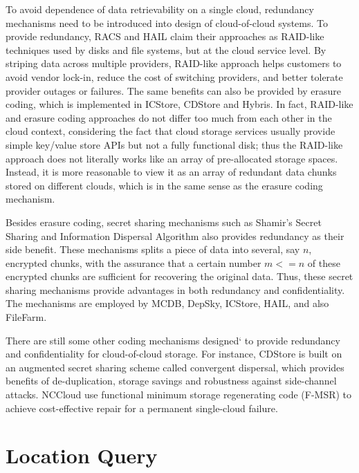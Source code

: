 To avoid dependence of data retrievability on a single cloud, redundancy mechanisms need to be introduced into design of cloud-of-cloud systems. To provide redundancy, RACS\cite{abu2010racs} and HAIL\cite{bowers2009hail} claim their approaches as RAID-like techniques used by disks and file systems, but at the cloud service level. By striping data across multiple providers, RAID-like approach helps customers to avoid vendor lock-in, reduce the cost of switching providers, and better tolerate provider outages or failures. The same benefits can also be provided by erasure coding, which is implemented in ICStore\cite{cachin2010dependable}, CDStore\cite{li2015cdstore} and Hybris\cite{dobre2014hybris}. In fact, RAID-like and erasure coding approaches do not differ too much from each other in the cloud context, considering the fact that cloud storage services usually provide simple key/value store APIs but not a fully functional disk; thus the RAID-like approach does not literally works like an array of pre-allocated storage spaces. Instead, it is more reasonable to view it as an array of redundant data chunks stored on different clouds, which is in the same sense as the erasure coding mechanism.

Besides erasure coding, secret sharing mechanisms such as Shamir's Secret Sharing\cite{shamir1979share} and Information Dispersal Algorithm\cite{rabin1989efficient} also provides redundancy as their side benefit. These mechanisms splits a piece of data into several, say $n$, encrypted chunks, with the assurance that a certain number $m <= n$ of these encrypted chunks are sufficient for recovering the original data. Thus, these secret sharing mechanisms provide advantages in both redundancy and confidentiality. The mechanisms are employed by MCDB\cite{alzain2011mcdb}, DepSky\cite{bessani2013depsky}, ICStore\cite{cachin2010dependable}, HAIL\cite{bowers2009hail}, and also FileFarm.

There are still some other coding mechanisms designed` to provide redundancy and confidentiality for cloud-of-cloud storage. For instance, CDStore\cite{li2015cdstore} is built on an augmented secret sharing scheme called convergent dispersal, which provides benefits of de-duplication, storage savings and robustness against side-channel attacks. NCCloud\cite{hu2012nccloud} use functional minimum storage regenerating code (F-MSR) to achieve cost-effective repair for a permanent single-cloud failure.

\section{Location Query}
\label{ss:coclocationquery}

